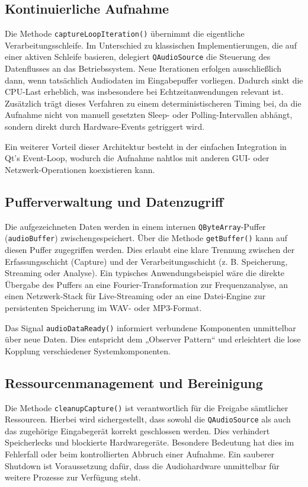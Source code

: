\subsection{Kontinuierliche Aufnahme}
Die Methode \texttt{captureLoopIteration()} übernimmt die eigentliche Verarbeitungsschleife. Im Unterschied zu klassischen Implementierungen, die auf einer aktiven Schleife basieren, delegiert \texttt{QAudioSource} die Steuerung des Datenflusses an das Betriebssystem.  
Neue Iterationen erfolgen ausschließlich dann, wenn tatsächlich Audiodaten im Eingabepuffer vorliegen. Dadurch sinkt die CPU-Last erheblich, was insbesondere bei Echtzeitanwendungen relevant ist. Zusätzlich trägt dieses Verfahren zu einem deterministischeren Timing bei, da die Aufnahme nicht von manuell gesetzten Sleep- oder Polling-Intervallen abhängt, sondern direkt durch Hardware-Events getriggert wird.  

Ein weiterer Vorteil dieser Architektur besteht in der einfachen Integration in Qt’s Event-Loop, wodurch die Aufnahme nahtlos mit anderen GUI- oder Netzwerk-Operationen koexistieren kann.

\subsection{Pufferverwaltung und Datenzugriff}
Die aufgezeichneten Daten werden in einem internen \texttt{QByteArray}-Puffer (\texttt{audioBuffer}) zwischengespeichert. Über die Methode \texttt{getBuffer()} kann auf diesen Puffer zugegriffen werden. Dies erlaubt eine klare Trennung zwischen der Erfassungsschicht (Capture) und der Verarbeitungsschicht (z. B. Speicherung, Streaming oder Analyse).  
Ein typisches Anwendungsbeispiel wäre die direkte Übergabe des Puffers an eine Fourier-Transformation zur Frequenzanalyse, an einen Netzwerk-Stack für Live-Streaming oder an eine Datei-Engine zur persistenten Speicherung im WAV- oder MP3-Format.

Das Signal \texttt{audioDataReady()} informiert verbundene Komponenten unmittelbar über neue Daten. Dies entspricht dem „Observer Pattern“ und erleichtert die lose Kopplung verschiedener Systemkomponenten.

\subsection{Ressourcenmanagement und Bereinigung}
Die Methode \texttt{cleanupCapture()} ist verantwortlich für die Freigabe sämtlicher Ressourcen. Hierbei wird sichergestellt, dass sowohl die \texttt{QAudioSource} als auch das zugehörige Eingabegerät korrekt geschlossen werden. Dies verhindert Speicherlecks und blockierte Hardwaregeräte.  
Besondere Bedeutung hat dies im Fehlerfall oder beim kontrollierten Abbruch einer Aufnahme. Ein sauberer Shutdown ist Voraussetzung dafür, dass die Audiohardware unmittelbar für weitere Prozesse zur Verfügung steht.

